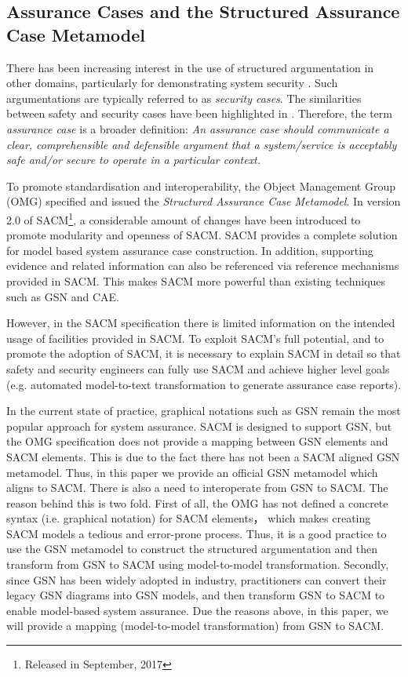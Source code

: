 \subsection{Assurance Cases and the Structured Assurance Case Metamodel}
There has been increasing interest in the use of structured argumentation in other domains, particularly for demonstrating system security \cite{bloomfield2010safety}. Such argumentations are typically referred to as \textit{security cases}. The similarities between safety and security cases have been highlighted in \cite{lautieri2005safsec}. Therefore, the term \textit{assurance case} is a broader definition: \textit{An assurance case should communicate a clear, comprehensible and defensible argument that a system/service is acceptably safe and/or secure to operate in a particular context.} 

To promote standardisation and interoperability, the Object Management Group (OMG) specified and issued the \textit{Structured Assurance Case Metamodel}. In version 2.0 of SACM\footnote{Released in September, 2017}, a considerable amount of changes have been introduced to promote modularity and openness of SACM. SACM provides a complete solution for model based system assurance case construction. In addition, supporting evidence and related information can also be referenced via reference mechanisms provided in SACM. This makes SACM more powerful than existing techniques such as GSN and CAE.

However, in the SACM specification there is limited information on the intended usage of facilities provided in SACM. To exploit SACM's full potential, and to promote the adoption of SACM, it is necessary to explain SACM in detail so that safety and security engineers can fully use SACM  and achieve higher level goals (e.g. automated model-to-text transformation to generate assurance case reports). 

In the current state of practice, graphical notations such as GSN remain the most popular approach for system assurance. 
SACM is designed to support GSN, but the OMG specification does not provide a mapping between GSN elements and SACM elements. 
This is due to the fact there has not been a SACM aligned GSN metamodel. 
Thus, in this paper we provide an official GSN metamodel which aligns to SACM. 
There is also a need to interoperate from GSN to SACM.
The reason behind this is two fold. First of all, the OMG has not defined a concrete syntax (i.e. graphical notation) for SACM elements， which makes creating SACM models a tedious and error-prone process. Thus, it is a good practice to use the GSN metamodel to construct the structured argumentation and then transform from GSN to SACM using model-to-model transformation. Secondly, since GSN has been widely adopted in industry, practitioners can convert their legacy GSN diagrams into GSN models, and then transform GSN to SACM to enable model-based system assurance. 
Due the reasons above, in this paper, we will provide a mapping (model-to-model transformation) from GSN to SACM.

